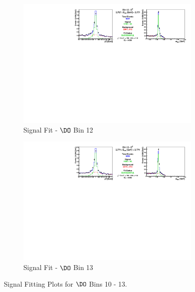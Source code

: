 \begin{figure}[h]
\begin{subfigure}[c]{0.99\textwidth}
\includegraphics[width=\textwidth]{figures/plots/fit_results/D0_bin_12.pdf}
\caption*{Signal Fit - $\DO$ Bin 12}
\end{subfigure}

\vspace{5pt}

\begin{subfigure}[c]{0.99\textwidth}
\includegraphics[width=\textwidth]{figures/plots/fit_results/D0_bin_13.pdf}
\caption*{Signal Fit - $\DO$ Bin 13}
\end{subfigure}

\caption{Signal Fitting Plots for $\DO$ Bins 10 - 13.}
\label{fig:DO_plots_10_13}

\end{figure}


